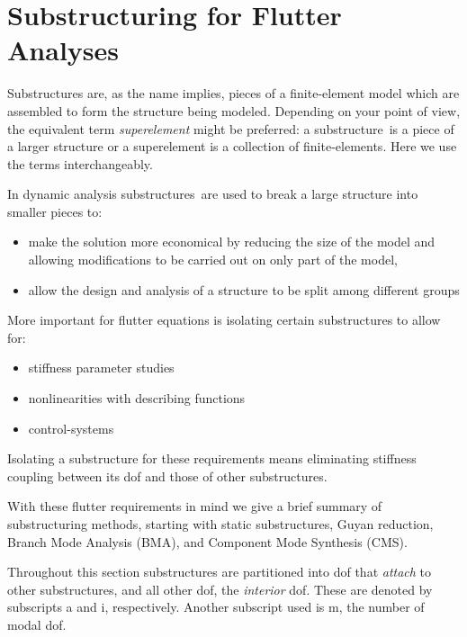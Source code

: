 \documentclass[10pt,openany,twoside]{book}
\numberwithin{equation}{section}   %
\newcommand{\Newterm}[1]{{\em #1}}
\newcommand{\Ss}{substructure}
\newcommand{\Sss}{substructures}
\begin{document}
\chapter{Substructuring for Flutter Analyses}\label{chap:substructuring}
Substructures are, as the name implies, pieces of a finite-element
model which are assembled to form the structure being modeled.
Depending on your point of view, the equivalent term
\Newterm{superelement} might be preferred:
a \Ss\ is a piece of a larger structure or
a superelement is a collection of finite-elements.
Here we use the terms interchangeably.

In dynamic analysis
\Sss\ are used to break a large structure into smaller pieces to:
\begin{itemize}
\item make the solution more economical by reducing the size of the model
	and allowing modifications to be carried out on only part of the model,
\item allow the design and analysis of a structure to be split
	among different groups
\end{itemize}
More important for flutter equations is isolating certain substructures to allow for:
\begin{itemize}
\item stiffness parameter studies
\item nonlinearities with describing functions
\item control-systems
\end{itemize}
Isolating a substructure for these requirements means eliminating stiffness
coupling between its dof and those of other substructures.

With these flutter requirements in mind we
give a brief summary of substructuring methods, starting with static
substructures, Guyan reduction, Branch Mode Analysis (BMA), and Component Mode
Synthesis (CMS).

Throughout this section substructures are partitioned into dof that \emph{attach}
to other substructures, and all other dof, the \emph{interior} dof. These are denoted
by subscripts a and i, respectively. Another subscript used is m, the number of
modal dof.
\end{document}
